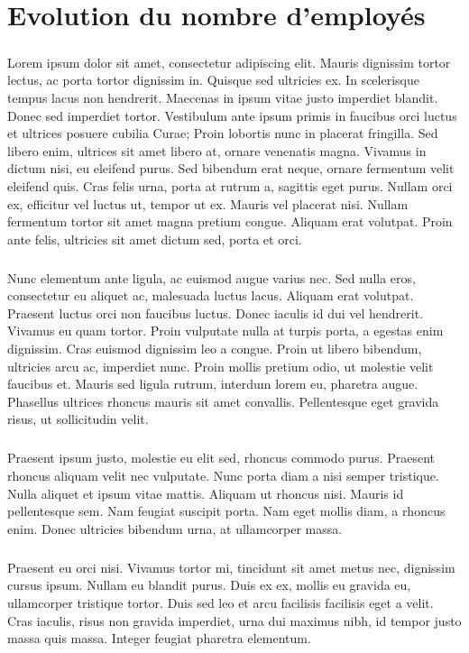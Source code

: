 \chapter{Evolution du nombre d'employés}
\paragraph{}Lorem ipsum dolor sit amet, consectetur adipiscing elit. Mauris dignissim tortor lectus, ac porta tortor dignissim in. Quisque sed ultricies ex. In scelerisque tempus lacus non hendrerit. Maecenas in ipsum vitae justo imperdiet blandit. Donec sed imperdiet tortor. Vestibulum ante ipsum primis in faucibus orci luctus et ultrices posuere cubilia Curae; Proin lobortis nunc in placerat fringilla. Sed libero enim, ultrices sit amet libero at, ornare venenatis magna. Vivamus in dictum nisi, eu eleifend purus. Sed bibendum erat neque, ornare fermentum velit eleifend quis. Cras felis urna, porta at rutrum a, sagittis eget purus. Nullam orci ex, efficitur vel luctus ut, tempor ut ex. Mauris vel placerat nisi. Nullam fermentum tortor sit amet magna pretium congue. Aliquam erat volutpat. Proin ante felis, ultricies sit amet dictum sed, porta et orci.
\paragraph{}Nunc elementum ante ligula, ac euismod augue varius nec. Sed nulla eros, consectetur eu aliquet ac, malesuada luctus lacus. Aliquam erat volutpat. Praesent luctus orci non faucibus luctus. Donec iaculis id dui vel hendrerit. Vivamus eu quam tortor. Proin vulputate nulla at turpis porta, a egestas enim dignissim. Cras euismod dignissim leo a congue. Proin ut libero bibendum, ultricies arcu ac, imperdiet nunc. Proin mollis pretium odio, ut molestie velit faucibus et. Mauris sed ligula rutrum, interdum lorem eu, pharetra augue. Phasellus ultrices rhoncus mauris sit amet convallis. Pellentesque eget gravida risus, ut sollicitudin velit.
\paragraph{}Praesent ipsum justo, molestie eu elit sed, rhoncus commodo purus. Praesent rhoncus aliquam velit nec vulputate. Nunc porta diam a nisi semper tristique. Nulla aliquet et ipsum vitae mattis. Aliquam ut rhoncus nisi. Mauris id pellentesque sem. Nam feugiat suscipit porta. Nam eget mollis diam, a rhoncus enim. Donec ultricies bibendum urna, at ullamcorper massa.
\paragraph{}Praesent eu orci nisi. Vivamus tortor mi, tincidunt sit amet metus nec, dignissim cursus ipsum. Nullam eu blandit purus. Duis ex ex, mollis eu gravida eu, ullamcorper tristique tortor. Duis sed leo et arcu facilisis facilisis eget a velit. Cras iaculis, risus non gravida imperdiet, urna dui maximus nibh, id tempor justo massa quis massa. Integer feugiat pharetra elementum.
